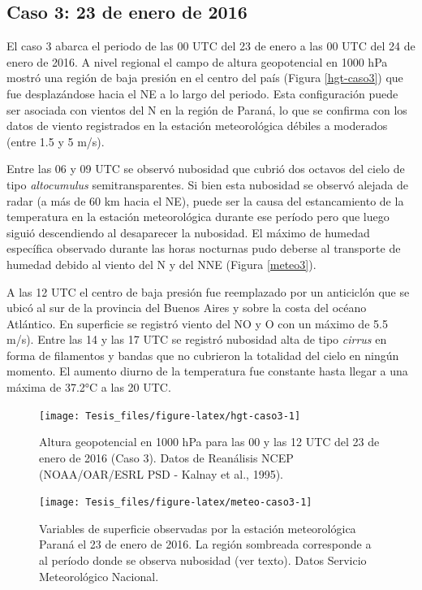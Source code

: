 \documentclass[12pt,spanish,oneside]{book}
\begin{document}
\subsection{Caso 3: 23 de enero de
2016}\label{caso-3-23-de-enero-de-2016}

El caso 3 abarca el periodo de las 00 UTC del 23 de enero a las 00 UTC
del 24 de enero de 2016. A nivel regional el campo de altura
geopotencial en 1000 hPa mostró una región de baja presión en el centro
del país (Figura \ref{hgt-caso3}) que fue desplazándose hacia el NE a lo
largo del periodo. Esta configuración puede ser asociada con vientos del
N en la región de Paraná, lo que se confirma con los datos de viento
registrados en la estación meteorológica débiles a moderados (entre 1.5
y 5 m/s).

Entre las 06 y 09 UTC se observó nubosidad que cubrió dos octavos del
cielo de tipo \emph{altocumulus} semitransparentes. Si bien esta
nubosidad se observó alejada de radar (a más de 60 km hacia el NE),
puede ser la causa del estancamiento de la temperatura en la estación
meteorológica durante ese período pero que luego siguió descendiendo al
desaparecer la nubosidad. El máximo de humedad específica observado
durante las horas nocturnas pudo deberse al transporte de humedad debido
al viento del N y del NNE (Figura \ref{meteo3}).

A las 12 UTC el centro de baja presión fue reemplazado por un anticiclón
que se ubicó al sur de la provincia del Buenos Aires y sobre la costa
del océano Atlántico. En superficie se registró viento del NO y O con un
máximo de 5.5 m/s). Entre las 14 y las 17 UTC se registró nubosidad alta
de tipo \emph{cirrus} en forma de filamentos y bandas que no cubrieron
la totalidad del cielo en ningún momento. El aumento diurno de la
temperatura fue constante hasta llegar a una máxima de 37.2°C a las 20
UTC.

\begin{figure}

{\centering \texttt{[image: Tesis\_files/figure-latex/hgt-caso3-1]} 

}

\caption{Altura geopotencial en 1000 hPa para las 00 y las 12 UTC del 23 de enero de 2016 (Caso 3). Datos de Reanálisis NCEP (NOAA/OAR/ESRL PSD - Kalnay et al., 1995). \label{hgt-caso3}}\label{fig:hgt-caso3}
\end{figure}

\begin{figure}

{\centering \texttt{[image: Tesis\_files/figure-latex/meteo-caso3-1]} 

}

\caption{Variables de superficie observadas por la estación meteorológica Paraná el 23 de enero de 2016. La región sombreada corresponde a al período donde se observa nubosidad (ver texto). Datos Servicio Meteorológico Nacional. \label{meteo3}}\label{fig:meteo-caso3}
\end{figure}
\end{document}
